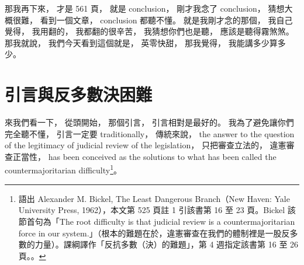 \hypertarget{w02:cue:367}{}那我再下來，
\hypertarget{w02:cue:368}{}才是 561 頁，
\hypertarget{w02:cue:369}{}就是 conclusion，
\hypertarget{w02:cue:370}{}剛才我念了 conclusion，
\hypertarget{w02:cue:371}{}猜想大概很難，
\hypertarget{w02:cue:372}{}看到一個文章，
\hypertarget{w02:cue:373}{}conclusion 都聽不懂。
\hypertarget{w02:cue:374}{}就是我剛才念的那個，
\hypertarget{w02:cue:375}{}我自己覺得，
\hypertarget{w02:cue:376}{}我用翻的，
\hypertarget{w02:cue:377}{}我都翻的很辛苦，
\hypertarget{w02:cue:378}{}我猜想你們也是聽，
\hypertarget{w02:cue:379}{}應該是聽得霧煞煞。
\hypertarget{w02:cue:380}{}那我就說，
\hypertarget{w02:cue:381}{}我們今天看到這個就是，
\hypertarget{w02:cue:382}{}英零快甜，
\hypertarget{w02:cue:383}{}那我覺得，
\hypertarget{w02:cue:384}{}我能講多少算多少。

\section{引言與反多數決困難}

\hypertarget{w02:cue:385}{}來我們看一下，
\hypertarget{w02:cue:386}{}從頭開始，
\hypertarget{w02:cue:387}{}那個引言，
\hypertarget{w02:cue:388}{}引言相對是最好的。
\hypertarget{w02:cue:389}{}我為了避免讓你們完全聽不懂，
\hypertarget{w02:cue:390}{}引言一定要 traditionally，
\hypertarget{w02:cue:391}{}傳統來說，
\hypertarget{w02:cue:392}{}the answer to the question
\hypertarget{w02:cue:393}{}of the legitimacy of judicial review
\hypertarget{w02:cue:394}{}of the legislation，
\hypertarget{w02:cue:395}{}只把審查立法的，
\hypertarget{w02:cue:396}{}違憲審查正當性，
\hypertarget{w02:cue:397}{}has been conceived as the solutions
\hypertarget{w02:cue:398}{}to what has been called
\hypertarget{w02:cue:399}{}the countermajoritarian difficulty\footnote{語出 Alexander M. Bickel, The Least Dangerous Branch（New Haven: Yale University Press, 1962），本文第 525 頁註 1 引該書第 16 至 23 頁。Bickel 該節首句為「The root difficulty is that judicial review is a countermajoritarian force in our system.」（根本的難題在於，違憲審查在我們的體制裡是一股反多數的力量）。課綱譯作「反抗多數（決）的難題」，第 4 週指定該書第 16 至 26 頁。\cite{bickel1962}。}。

